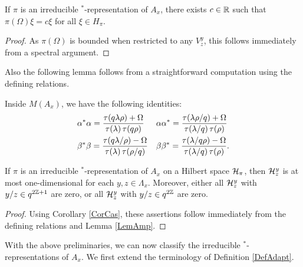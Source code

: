 \begin{Cor}\label{CorCas} If $\pi$ is an irreducible $^*$-representation of $A_x$, there exists $c\in \mathbb{R}$ such that $\pi(\Omega)\xi = c\xi$ for all $\xi \in H_{\pi}$. 
\end{Cor} 
\begin{proof} As $\pi(\Omega)$ is bounded when restricted to any $V^y_z$, this follows immediately from a spectral argument. 
\end{proof} 

Also the following lemma follows from a straightforward computation using the defining relations.

\begin{Lem}\label{LemAmp} Inside $M(A_x)$, we have the following identities:
\begin{align*}
&\alpha^*\alpha = \frac{\operatorname{\tau}(q\lambda\rho)+\Omega}{\operatorname{\tau}(\lambda)\operatorname{\tau}(q\rho)} && \alpha\alpha^* = \frac{\operatorname{\tau}(\lambda\rho/q)+\Omega}{\operatorname{\tau}(\lambda/q)\operatorname{\tau}(\rho)}\\ 
&\beta^*\beta = \frac{\operatorname{\tau}(q\lambda/\rho)-\Omega}{\operatorname{\tau}(\lambda)\operatorname{\tau}(\rho/q)}&& \beta\beta^* = \frac{\operatorname{\tau}(\lambda/q\rho)-\Omega}{\operatorname{\tau}(\lambda/q)\operatorname{\tau}(\rho)}.
\end{align*}
\end{Lem}


\begin{Cor}\label{CorOneDim} If $\pi$ is an irreducible $^*$-representation of $A_x$ on a Hilbert space $\mathcal{H}_{\pi}$, then $\mathcal{H}^y_z$ is at most one-dimensional for each $y,z\in \Lambda_x$. Moreover, either all $\mathcal{H}^y_z$ with $y/z\in q^{2\mathbb{Z}+1}$ are zero, or all $\mathcal{H}^y_z$ with $y/z\in q^{2\mathbb{Z}}$ are zero. 
\end{Cor} 
\begin{proof} 
Using Corollary \ref{CorCas}, these assertions follow immediately from the defining relations and Lemma \ref{LemAmp}.
\end{proof}



With the above preliminaries, we can now classify the irreducible $^*$-representations of $A_x$. We first extend the terminology of Definition \ref{DefAdapt}.


